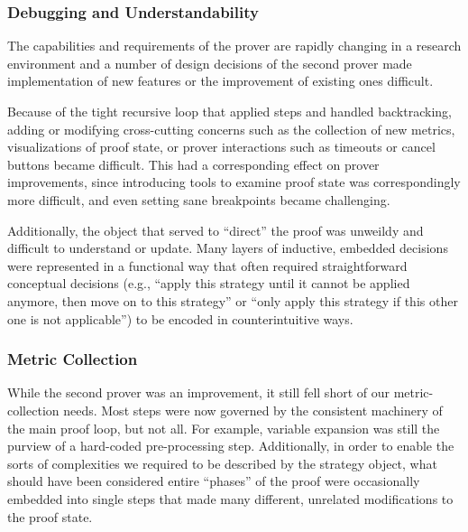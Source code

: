 		\subsubsection{Debugging and Understandability}	

The capabilities and requirements of the prover are rapidly changing in a research environment and a number of design decisions of the second prover made implementation of new features or the improvement of existing ones difficult.

Because of the tight recursive loop that applied steps and handled backtracking, adding or modifying cross-cutting concerns such as the collection of new metrics, visualizations of proof state, or prover interactions such as timeouts or cancel buttons became difficult.  This had a corresponding effect on prover improvements, since introducing tools to examine proof state was correspondingly more difficult, and even setting sane breakpoints became challenging.

Additionally, the object that served to ``direct'' the proof was unweildy and difficult to understand or update.  Many layers of inductive, embedded decisions were represented in a functional way that often required straightforward conceptual decisions (e.g., ``apply this strategy until it cannot be applied anymore, then move on to this strategy'' or ``only apply this strategy if this other one is not applicable'') to be encoded in counterintuitive ways.

		\subsubsection{Metric Collection}	

While the second prover was an improvement, it still fell short of our metric-collection needs.  Most steps were now governed by the consistent machinery of the main proof loop, but not all.  For example, variable expansion was still the purview of a hard-coded pre-processing step.  Additionally, in order to enable the sorts of complexities we required to be described by the strategy object, what should have been considered entire ``phases'' of the proof were occasionally embedded into single steps that made many different, unrelated modifications to the proof state.

